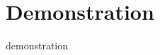 \documentclass[12pt]{article}
\begin{document}
\doublespacing


















\section*{Demonstration}

{demonstration}



\end{document}
